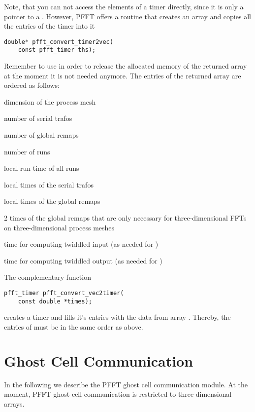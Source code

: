 Note, that you can not access the elements of a timer directly, since it is only a pointer to a .
However, PFFT offers a routine that creates an array and copies all the entries of the timer into it
\begin{lstlisting}
double* pfft_convert_timer2vec(
    const pfft_timer ths);
\end{lstlisting}
Remember to use  in order to release the allocated memory of the returned array at the moment it is not needed anymore.
The entries of the returned array are ordered as follows:
\begin{compactitem}
  \item dimension of the process mesh 
  \item number of serial trafos 
  \item number of global remaps 
  \item number of  runs 
  \item local run time of all runs
  \item {} local times of the serial trafos
  \item {} local times of the global remaps
  \item 2 times of the global remaps that are only necessary for three-dimensional FFTs on three-dimensional process meshes
  \item time for computing twiddled input (as needed for ) 
  \item time for computing twiddled output (as needed for ) 
\end{compactitem}
The complementary function
\begin{lstlisting}
pfft_timer pfft_convert_vec2timer(
    const double *times);
\end{lstlisting}
creates a timer and fills it's entries with the data from array . Thereby, the entries of 
must be in the same order as above. 



\section{Ghost Cell Communication}\label{sec:gc}
In the following we describe the PFFT ghost cell communication module.
At the moment, PFFT ghost cell communication is restricted to three-dimensional arrays.

